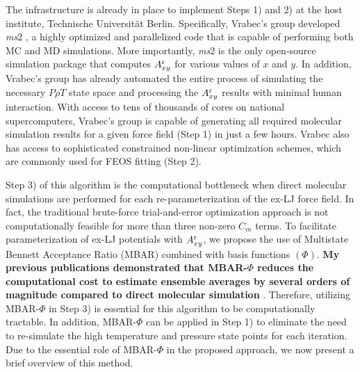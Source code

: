 \documentclass[12pt,a4paper]{article}
\begin{document}
The infrastructure is already in place to implement Steps 1) and 2) at the host institute, Technische Universit\"{a}t Berlin. Specifically, Vrabec's group developed \textit{ms}2 \cite{ms2}, a highly optimized and parallelized code that is capable of performing both MC and MD simulations. More importantly, \textit{ms}2 is the only open-source simulation package that computes $A_{xy}^{\rm r}$ for various values of $x$ and $y$. In addition, Vrabec's group has already automated the entire process of simulating the necessary $P \rho T$ state space and processing the $A_{xy}^{\rm r}$ results with minimal human interaction. With access to tens of thousands of cores on national supercomputers, Vrabec's group is capable of generating all required molecular simulation results for a given force field (Step 1) in just a few hours. Vrabec also has access to sophisticated constrained non-linear optimization schemes, which are commonly used for FEOS fitting (Step 2). 



Step 3) of this algorithm is the computational bottleneck when direct molecular simulations are performed for each re-parameterization of the ex-LJ force field. In fact, the traditional brute-force trial-and-error optimization approach is not computationally feasible for more than three non-zero $C_m$ terms. To facilitate parameterization of ex-LJ potentials with $A_{xy}^{\rm r}$, we propose the use of Multistate Bennett Acceptance Ratio (MBAR) combined with basis functions $(\Phi)$. \textbf{My previous publications demonstrated that MBAR-$\Phi$ reduces the computational cost to estimate ensemble averages by several orders of magnitude compared to direct molecular simulation} \cite{Messerly2018_1,Messerly2018_2}. Therefore, utilizing MBAR-$\Phi$ in Step 3) is essential for this algorithm to be computationally tractable. In addition, MBAR-$\Phi$ can be applied in Step 1) to eliminate the need to re-simulate the high temperature and pressure state points for each iteration. Due to the essential role of MBAR-$\Phi$ in the proposed approach, we now present a brief overview of this method. 
\end{document}
